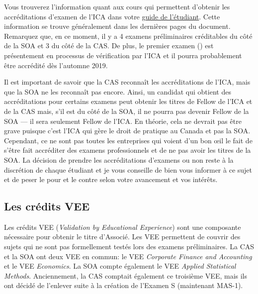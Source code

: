 Vous trouverez l'information quant aux cours qui permettent d'obtenir les accréditations d'examen de l'ICA dans votre \href{https://www.act.ulaval.ca/programmes-et-cours/premier-cycle/guide-de-letudiant/}{guide de l'étudiant}. Cette information se trouve généralement dans les dernières pages du document. Remarquez que, en ce moment, il y a 4 examens préliminaires créditables du côté de la SOA et 3 du côté de la CAS. De plus, le premier examen () est présentement en processus de vérification par l'ICA et il pourra probablement être accrédité dès l'automne 2019. \vspace{\baselineskip}

Il est important de savoir que la CAS reconnaît les accréditations de l'ICA, mais que la SOA ne les reconnaît pas encore. Ainsi, un candidat qui obtient des accréditations pour certains examens peut obtenir les titres de Fellow de l'ICA et de la CAS mais, s'il est du côté de la SOA, il ne pourra pas devenir Fellow de la SOA --- il sera seulement Fellow de l'ICA. En théorie, cela ne devrait pas être grave puisque c'est l'ICA qui gère le droit de pratique au Canada et pas la SOA. Cependant, ce ne sont pas toutes les entreprises qui voient d'un bon œil le fait de s'être fait accréditer des examens professionnels et de ne pas avoir les titres de la SOA. La décision de prendre les accréditations d'examens ou non reste à la discrétion de chaque étudiant et je vous conseille de bien vous informer à ce sujet et de peser le pour et le contre selon votre avancement et vos intérêts.

\newpage

\subsection*{Les crédits VEE}
\label{subsec:vee}
Les crédits VEE (\emph{Validation by Educational Experience}) sont une composante nécessaire pour obtenir le titre d'Associé. Les VEE permettent de couvrir des sujets qui ne sont pas formellement testés lors des examens préliminaires. La CAS et la SOA ont deux VEE en commun: le VEE \emph{Corporate Finance and Accounting} et le VEE \emph{Economics}. La SOA compte également le VEE \emph{Applied Statistical Methods}. Anciennement, la CAS comptait également ce troisième VEE, mais ils ont décidé de l'enlever suite à la création de l'Examen S (maintenant MAS-1).\vspace{\baselineskip}

